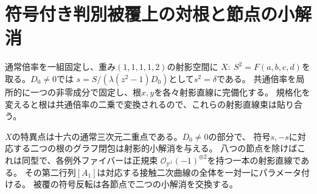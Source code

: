 \section{符号付き判別被覆上の対根と節点の小解消}
\label{sec:paired-root-resolution}
通常倍率を一組固定し、重み$(1,1,1,1,2)$の射影空間に
$X:\ S^2=F(a,b,c,d)$を取る。$D_0\ne0$では
$s=S/(\lambda(z^2-1)D_0)$として$s^2=\delta$である。
共通倍率を局所的に一つの非零成分で固定し、根$x,y$を各々射影直線に完備化する。
規格化を変えると根は共通倍率の二乗で変換されるので、これらの射影直線束は貼り合う。
\begin{theorem}\label{thm:paired-root-small-resolution}
$X$の特異点は十六の通常三次元二重点である。$D_0\ne0$の部分で、
符号$s,-s$に対応する二つの根のグラフ閉包は射影的小解消を与える。
八つの節点を除けばこれは同型で、各例外ファイバーは正規束
$\mathcal O_{\mathbb P^1}(-1)^{\oplus2}$を持つ一本の射影直線である。
その第二行列$[A_1]$は対応する接触二次曲線の全体を一対一にパラメータ付ける。
被覆の符号反転は各節点で二つの小解消を交換する。
\end{theorem}
